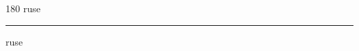
\begin{frame}
\begin{center}
\begin{turn}{180}
{\fontsize{2.5cm}{1em}\selectfont ruse}
\end{turn}
\vspace{1em}\par  
\hrule
\vspace{1em}\par  
{\fontsize{2.5cm}{1em}\selectfont ruse}
\end{center}
\end{frame}
